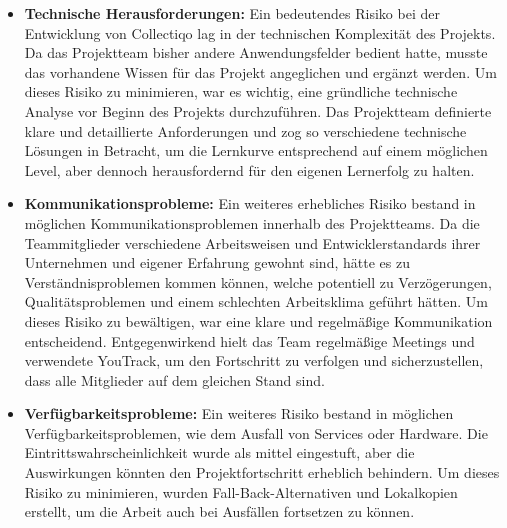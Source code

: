 \begin{itemize}[itemsep=1em, leftmargin=*]
    \item \textbf{Technische Herausforderungen:} Ein bedeutendes Risiko bei der Entwicklung von Collectiqo lag in der technischen Komplexität des Projekts.
    Da das Projektteam bisher andere Anwendungsfelder bedient hatte, musste das vorhandene Wissen für das Projekt angeglichen und ergänzt werden.
    Um dieses Risiko zu minimieren, war es wichtig, eine gründliche technische Analyse vor Beginn des Projekts durchzuführen.
    Das Projektteam definierte klare und detaillierte Anforderungen und zog so verschiedene technische Lösungen in Betracht, um die Lernkurve entsprechend auf einem möglichen Level, aber dennoch herausfordernd für den eigenen Lernerfolg zu halten.

    \item \textbf{Kommunikationsprobleme:} Ein weiteres erhebliches Risiko bestand in möglichen Kommunikationsproblemen innerhalb des Projektteams.
    Da die Teammitglieder verschiedene Arbeitsweisen und Entwicklerstandards ihrer Unternehmen und eigener Erfahrung gewohnt sind, hätte es zu Verständnisproblemen kommen können, welche potentiell zu Verzögerungen, Qualitätsproblemen und einem schlechten Arbeitsklima geführt hätten.
    Um dieses Risiko zu bewältigen, war eine klare und regelmäßige Kommunikation entscheidend.
    Entgegenwirkend hielt das Team regelmäßige Meetings und verwendete YouTrack, um den Fortschritt zu verfolgen und sicherzustellen, dass alle Mitglieder auf dem gleichen Stand sind.

    \item \textbf{Verfügbarkeitsprobleme:} Ein weiteres Risiko bestand in möglichen Verfügbarkeitsproblemen, wie dem Ausfall von Services oder Hardware.
    Die Eintrittswahrscheinlichkeit wurde als mittel eingestuft, aber die Auswirkungen könnten den Projektfortschritt erheblich behindern.
    Um dieses Risiko zu minimieren, wurden Fall-Back-Alternativen und Lokalkopien erstellt, um die Arbeit auch bei Ausfällen fortsetzen zu können.
\end{itemize}


